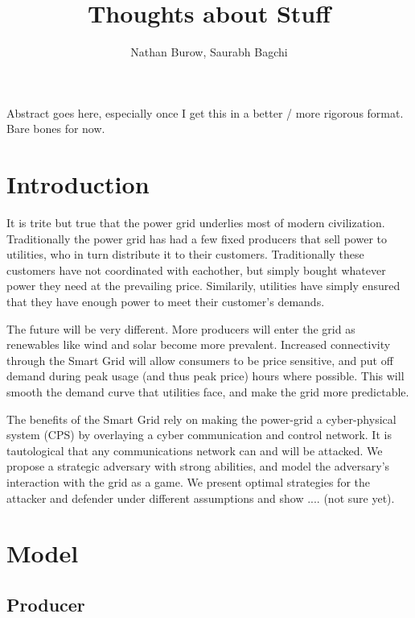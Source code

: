 \documentclass{article}
\begin{document}
\title{Thoughts about Stuff}

\author{Nathan Burow, Saurabh Bagchi}

\maketitle
\begin{multicols}{2}

Abstract goes here, especially once I get this in a better / more rigorous format.  Bare bones for now.

\section{Introduction}

It is trite but true that the power grid underlies most of modern civilization.  Traditionally the power grid has had a 
few fixed producers that sell power to utilities, who in turn distribute it to their customers.  Traditionally these 
customers have not coordinated with eachother, but simply bought whatever power they need at the prevailing price.  
Similarily, utilities have simply ensured that they have enough power to meet their customer's demands.  

The future will be very different.  More producers will enter the grid as renewables like wind and solar become more
prevalent.  Increased connectivity through the Smart Grid will allow consumers to be price sensitive, and put off 
demand during peak usage (and thus peak price) hours where possible.  This will smooth the demand curve that utilities face,
and make the grid more predictable.

The benefits of the Smart Grid rely on making the power-grid a cyber-physical system (CPS) by overlaying a cyber 
communication and control network.  It is tautological that any communications network can and will be attacked.  
We propose a strategic adversary with strong abilities, and model the adversary's interaction with the grid as a game.
We present optimal strategies for the attacker and defender under different assumptions and show .... (not sure yet).

\section{Model}

\subsection{Producer}


\end{multicols}
\end{document}
